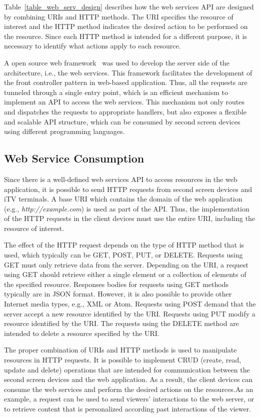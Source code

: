 \documentclass[journal]{IEEEtran}
\begin{document}
Table~\ref{table_web_serv_design} describes how the web services API are designed by combining URIs and HTTP methods. The URI specifies the resource of interest and the HTTP method indicates the desired action to be performed on the resource. Since each HTTP method is intended for a different purpose, it is necessary to identify what actions apply to each resource.

A open source web framework~\cite{Wheeler2013} was used to develop the server side of the architecture, i.e., the web services. This framework facilitates the development of the front controller pattern in web-based application. Thus, all the requests are tunneled through a single entry point, which is an efficient mechanism to implement an API to access the web services. This mechanism not only routes and dispatches the requests to appropriate handlers, but also exposes a flexible and scalable API structure, which can be consumed by second screen devices using different programming languages.

\subsection{Web Service Consumption}

Since there is a well-defined web services API to access resources in the web application, it is possible to send HTTP requests from second screen devices and iTV terminals. A base URI which contains the domain of the web application (e.g., \emph{http://example.com}) is used as part of the API. Thus, the implementation of the HTTP requests in the client devices must use the entire URI, including the resource of interest.

The effect of the HTTP request depends on the type of HTTP method that is used, which typically can be GET, POST, PUT, or DELETE. Requests using GET must only retrieve data from the server. Depending on the URI, a request using GET should retrieve either a single element or a collection of elements of the specified resource. Responses bodies for requests using GET methods typically are in JSON format. However, it is also possible to provide other Internet media types, e.g., XML or Atom. Requests using POST demand that the server accept a new resource identified by the URI. Requests using PUT modify a resource identified by the URI. The requests using the DELETE method are intended to delete a resource specified by the URI.

The proper combination of URIs and HTTP methods is used to manipulate resources in HTTP requests. It is possible to implement CRUD (create, read, update and delete) operations that are intended for communication between the second screen devices and the web application. As a result, the client devices can consume the web services and perform the desired actions on the resources.As an example, a request can be used to send viewers' interactions to the web server, or to retrieve content that is personalized according past interactions of the viewer.
\end{document}
